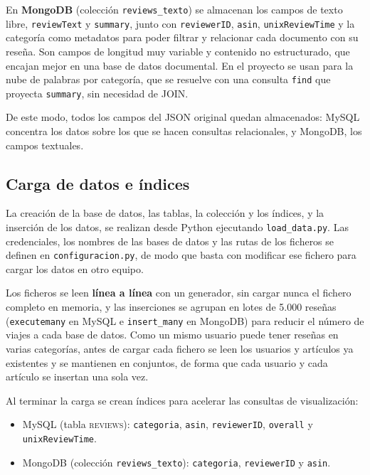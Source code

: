 \documentclass[11pt,a4paper]{article}
\newcommand{\code}[1]{\texttt{#1}}
\begin{document}
En \textbf{MongoDB} (colección \code{reviews\_texto}) se almacenan los campos de texto libre, \code{reviewText} y \code{summary}, junto con \code{reviewerID}, \code{asin}, \code{unixReviewTime} y la categoría como metadatos para poder filtrar y relacionar cada documento con su reseña. Son campos de longitud muy variable y contenido no estructurado, que encajan mejor en una base de datos documental. En el proyecto se usan para la nube de palabras por categoría, que se resuelve con una consulta \code{find} que proyecta \code{summary}, sin necesidad de JOIN.

De este modo, todos los campos del JSON original quedan almacenados: MySQL concentra los datos sobre los que se hacen consultas relacionales, y MongoDB, los campos textuales.

\subsection{Carga de datos e índices}

La creación de la base de datos, las tablas, la colección y los índices, y la inserción de los datos, se realizan desde Python ejecutando \code{load\_data.py}. Las credenciales, los nombres de las bases de datos y las rutas de los ficheros se definen en \code{configuracion.py}, de modo que basta con modificar ese fichero para cargar los datos en otro equipo.

Los ficheros se leen \textbf{línea a línea} con un generador, sin cargar nunca el fichero completo en memoria, y las inserciones se agrupan en lotes de 5.000 reseñas (\code{executemany} en MySQL e \code{insert\_many} en MongoDB) para reducir el número de viajes a cada base de datos. Como un mismo usuario puede tener reseñas en varias categorías, antes de cargar cada fichero se leen los usuarios y artículos ya existentes y se mantienen en conjuntos, de forma que cada usuario y cada artículo se insertan una sola vez.

Al terminar la carga se crean índices para acelerar las consultas de visualización:

\begin{itemize}
\item MySQL (tabla \textsc{reviews}): \code{categoria}, \code{asin}, \code{reviewerID}, \code{overall} y \code{unixReviewTime}.
\item MongoDB (colección \code{reviews\_texto}): \code{categoria}, \code{reviewerID} y \code{asin}.
\end{itemize}
\end{document}
